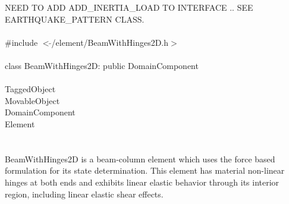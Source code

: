 
NEED TO ADD ADD\_INERTIA\_LOAD TO INTERFACE .. SEE EARTHQUAKE\_PATTERN
CLASS.\\

   \\
\indent \#include $<\tilde{ }$/element/BeamWithHinges2D.h$>$  \\

  \\
\indent class BeamWithHinges2D: public DomainComponent \\

 \\
\indent TaggedObject \\
\indent MovableObject \\
\indent\indent DomainComponent \\
\indent\indent\indent Element \\
\indent\indent\indent{} \\

  \\
\indent BeamWithHinges2D is a beam-column element which uses the force
based formulation for its state determination.  This element has
material non-linear hinges at both ends and exhibits linear elastic
behavior through its interior region, including linear elastic shear
effects. \\

